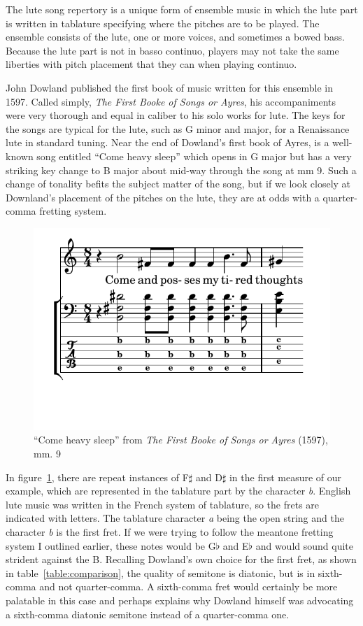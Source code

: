 The lute song repertory is a unique form of ensemble music in which the lute part is
written in tablature specifying where the pitches are to be played. The ensemble
consists of the lute, one or more voices, and sometimes a bowed bass.  Because the lute
part is not in basso continuo, players may not take the same liberties with
pitch placement that they can when playing continuo.

John Dowland published the first book of music written for this ensemble in 1597.
Called simply, \textit{The First Booke of Songs or Ayres}, his accompaniments were very
thorough and equal in caliber to his solo works for lute.  The keys for the songs are
typical for the lute, such as G minor and major, for a Renaissance lute in standard
tuning. Near the end of Dowland's first book of Ayres, is a well-known song entitled
``Come heavy sleep'' which opens in G major but has a very striking key change to B
major about mid-way through the song at mm 9. Such a change of tonality befits the
subject matter of the song, but if we look closely at Downland's placement of the
pitches on the lute, they are at odds with a quarter-comma fretting system.
\begin{figure}[h]
\centering
\includegraphics{examples/come.pdf}
\caption{``Come heavy sleep'' from \textit{The First Booke of Songs or Ayres} (1597), mm. 9}
\label{dowland-come}
\end{figure}
In figure~\ref{dowland-come}, there are repeat instances of F$\sharp$ and D$\sharp$ in the
first measure of our example, which are represented in the tablature part by the character
\textit{b}.  English lute music was written in the French system of tablature, so the
frets are indicated with letters.  The tablature character \textit{a} being the open
string and the character \textit{b} is the first fret.  If we were trying to follow the
meantone fretting system I outlined earlier, these notes would be G$\flat$ and E$\flat$
and would sound quite strident against the B.  Recalling Dowland's own choice for the
first fret, as shown in table~\ref{table:comparison}, the quality of semitone is diatonic,
but is in sixth-comma and not quarter-comma.  A sixth-comma fret would certainly be more
palatable in this case and perhaps explains why Dowland himself was advocating a sixth-comma
diatonic semitone instead of a quarter-comma one.

